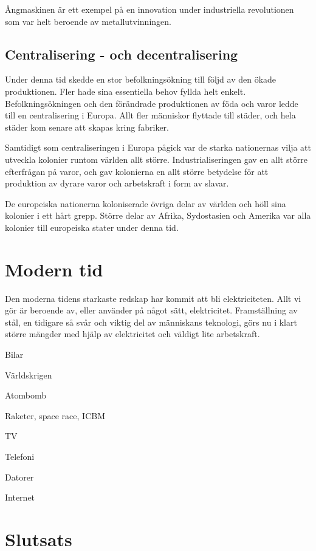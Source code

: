 \documentclass[a4paper,12pt,fleqn]{article}
\begin{document}
Ångmaskinen är ett exempel på en innovation under industriella revolutionen som var helt beroende av metallutvinningen. 

\subsection{Centralisering - och decentralisering}

Under denna tid skedde en stor befolkningsökning till följd av den ökade produktionen. Fler hade sina essentiella behov fyllda helt enkelt. Befolkningsökningen och den förändrade produktionen av föda och varor ledde till en centralisering i Europa. Allt fler människor flyttade till städer, och hela städer kom senare att skapas kring fabriker. 

Samtidigt som centraliseringen i Europa pågick var de starka nationernas vilja att utveckla kolonier runtom världen allt större. Industrialiseringen gav en allt större efterfrågan på varor, och gav kolonierna en allt större betydelse för att produktion av dyrare varor och arbetskraft i form av slavar. 

De europeiska nationerna koloniserade övriga delar av världen och höll sina kolonier i ett hårt grepp. Större delar av Afrika, Sydostasien och Amerika var alla kolonier till europeiska stater under denna tid. 


\newpage
\section{Modern tid}

Den moderna tidens starkaste redskap har kommit att bli elektriciteten. Allt vi gör är beroende av, eller använder på något sätt, elektricitet. Framställning av stål, en tidigare så svår och viktig del av människans teknologi, görs nu i klart större mängder med hjälp av elektricitet och väldigt lite arbetskraft. 

Bilar

Världskrigen

Atombomb

Raketer, space race, ICBM

TV

Telefoni

Datorer

Internet

\newpage

\section{Slutsats}
\end{document}

